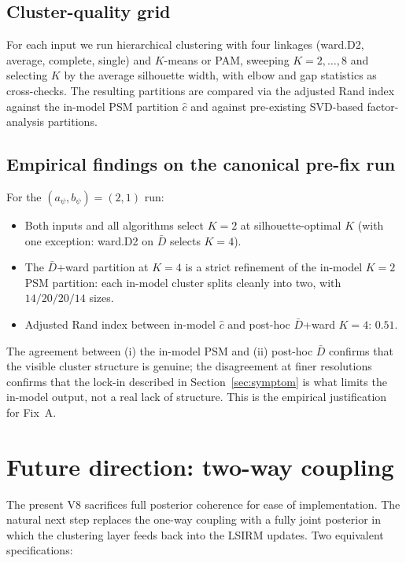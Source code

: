 \documentclass[11pt]{article}
\begin{document}
\subsection{Cluster-quality grid}

For each input we run hierarchical clustering with four linkages (ward.D2, average, complete, single) and $K$-means or PAM, sweeping $K=2,\dots,8$ and selecting $K$ by the average silhouette width, with elbow and gap statistics as cross-checks.
The resulting partitions are compared via the adjusted Rand index against the in-model PSM partition $\hat c$ and against pre-existing SVD-based factor-analysis partitions.

\subsection{Empirical findings on the canonical pre-fix run}

For the $(a_\psi,b_\psi)=(2,1)$ run:
\begin{itemize}[leftmargin=1.5em]
    \item Both inputs and all algorithms select $K=2$ at silhouette-optimal $K$ (with one exception: ward.D2 on $\bar D$ selects $K=4$).
    \item The $\bar D$+ward partition at $K=4$ is a strict refinement of the in-model $K=2$ PSM partition: each in-model cluster splits cleanly into two, with $14/20/20/14$ sizes.
    \item Adjusted Rand index between in-model $\hat c$ and post-hoc $\bar D$+ward $K=4$: $0.51$.
\end{itemize}
The agreement between (i) the in-model PSM and (ii) post-hoc $\bar D$ confirms that the visible cluster structure is genuine; the disagreement at finer resolutions confirms that the lock-in described in Section~\ref{sec:symptom} is what limits the in-model output, not a real lack of structure.
This is the empirical justification for Fix~A.

\section{Future direction: two-way coupling}\label{sec:future}

The present V8 sacrifices full posterior coherence for ease of implementation. The natural next step replaces the one-way coupling with a fully joint posterior in which the clustering layer feeds back into the LSIRM updates. Two equivalent specifications:
\end{document}
